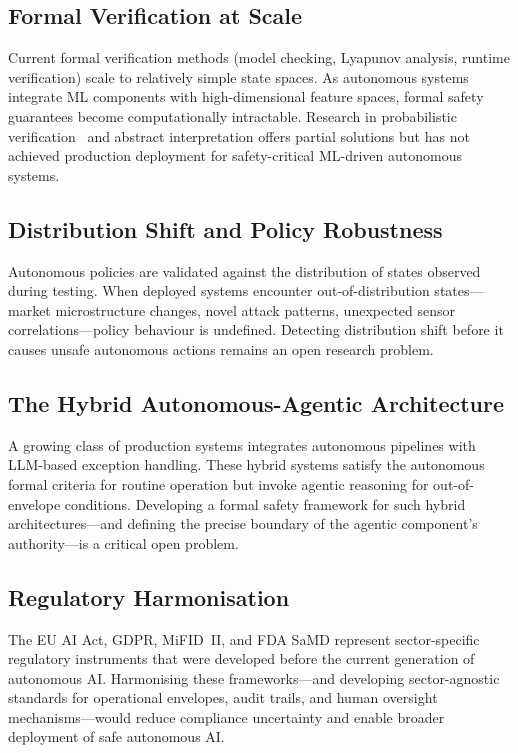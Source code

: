 \documentclass[12pt, a4paper]{article}
\begin{document}
\subsection{Formal Verification at Scale}
Current formal verification methods (model checking, Lyapunov analysis, runtime verification) scale to relatively simple state spaces. As autonomous systems integrate ML components with high-dimensional feature spaces, formal safety guarantees become computationally intractable. Research in probabilistic verification~\citep{kwiatkowska2020probabilistic} and abstract interpretation offers partial solutions but has not achieved production deployment for safety-critical ML-driven autonomous systems.

\subsection{Distribution Shift and Policy Robustness}
Autonomous policies are validated against the distribution of states observed during testing. When deployed systems encounter out-of-distribution states---market microstructure changes, novel attack patterns, unexpected sensor correlations---policy behaviour is undefined. Detecting distribution shift before it causes unsafe autonomous actions remains an open research problem.

\subsection{The Hybrid Autonomous-Agentic Architecture}
A growing class of production systems integrates autonomous pipelines with LLM-based exception handling. These hybrid systems satisfy the autonomous formal criteria for routine operation but invoke agentic reasoning for out-of-envelope conditions. Developing a formal safety framework for such hybrid architectures---and defining the precise boundary of the agentic component's authority---is a critical open problem.

\subsection{Regulatory Harmonisation}
The EU AI Act, GDPR, MiFID~II, and FDA SaMD represent sector-specific regulatory instruments that were developed before the current generation of autonomous AI. Harmonising these frameworks---and developing sector-agnostic standards for operational envelopes, audit trails, and human oversight mechanisms---would reduce compliance uncertainty and enable broader deployment of safe autonomous AI.
\end{document}
